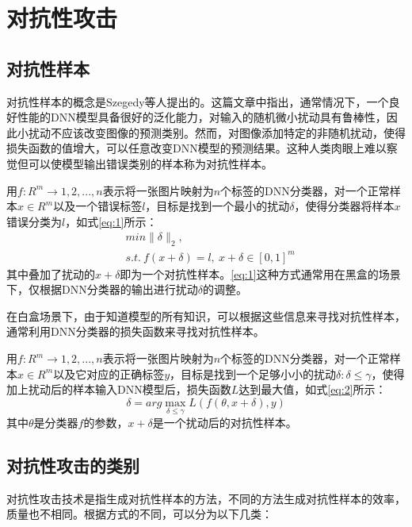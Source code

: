 \section{对抗性攻击}

\subsection{对抗性样本}
 
对抗性样本的概念是Szegedy等人\cite{szegedy2013intriguing}提出的。这篇文章中指出，通常情况下，一个良好性能的DNN模型具备很好的泛化能力，对输入的随机微小扰动具有鲁棒性，因此小扰动不应该改变图像的预测类别。然而，对图像添加特定的非随机扰动，使得损失函数的值增大，可以任意改变DNN模型的预测结果。这种人类肉眼上难以察觉但可以使模型输出错误类别的样本称为对抗性样本。 

用$f:R^m \rightarrow {1,2,...,n}$表示将一张图片映射为$n$个标签的DNN分类器，对一个正常样本$x \in R^m$以及一个错误标签$l$，目标是找到一个最小的扰动$\delta$，使得分类器将样本$x$错误分类为$l$，如式\ref{eq:1}所示：
\begin{equation}
	\label{eq:1}
	\begin{split}
	&min\parallel \delta \parallel_2, \\
	 &s.t. \ f(x + \delta) = l,\ x + \delta \in [0,1]^m
	\end{split}
\end{equation}
其中叠加了扰动的$x +\delta$即为一个对抗性样本。\ref{eq:1}这种方式通常用在黑盒的场景下，仅根据DNN分类器的输出进行扰动$\delta$的调整。
 
 在白盒场景下，由于知道模型的所有知识，可以根据这些信息来寻找对抗性样本，通常利用DNN分类器的损失函数来寻找对抗性样本。
 
 用$f:R^m \rightarrow {1,2,...,n}$表示将一张图片映射为$n$个标签的DNN分类器，对一个正常样本$x \in R^m$以及它对应的正确标签$y$，目标是找到一个足够小小的扰动$\delta:\delta \leq \gamma$，使得加上扰动后的样本输入DNN模型后，损失函数$L$达到最大值，如式\ref{eq:2}所示：
 \begin{equation}
 	\label{eq:2}
 		\delta = arg \mathop{max} \limits_{\delta \leq \gamma} L(f(\theta, x + \delta), y)
\end{equation}
其中$\theta$是分类器$f$的参数，$x + \delta$是一个扰动后的对抗性样本。
 
 \subsection{对抗性攻击的类别}

对抗性攻击技术是指生成对抗性样本的方法，不同的方法生成对抗性样本的效率，质量也不相同。根据方式的不同，可以分为以下几类：

